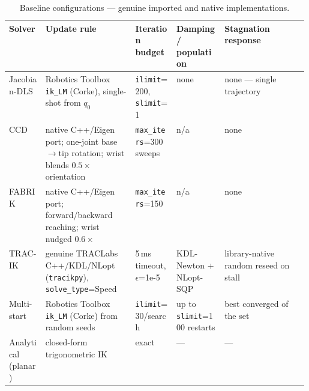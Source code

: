 \begin{table}[t]
\centering
\caption{Baseline configurations --- genuine imported and native implementations.}
\label{tab:baselines}
\small
\begin{tabular}{@{}lp{0.30\linewidth}llp{0.28\linewidth}@{}}
\toprule
Solver & Update rule & Iteration budget & Damping / population & Stagnation response \\
\midrule
Jacobian-DLS & Robotics Toolbox \texttt{ik\_LM} (Corke), single-shot from $q_0$ & \texttt{ilimit}=200, \texttt{slimit}=1 & none & none --- single trajectory \\
CCD & native C++/Eigen port; one-joint base$\to$tip rotation; wrist blends $0.5\times$ orientation & \texttt{max\_iters}=300 sweeps & n/a & none \\
FABRIK & native C++/Eigen port; forward/backward reaching; wrist nudged $0.6\times$ & \texttt{max\_iters}=150 & n/a & none \\
TRAC-IK & genuine TRACLabs C++/KDL/NLopt (\texttt{tracikpy}), \texttt{solve\_type}=Speed & 5\,ms timeout, $\epsilon$=1e-5 & KDL-Newton + NLopt-SQP & library-native random reseed on stall \\
Multi-start & Robotics Toolbox \texttt{ik\_LM} (Corke) from random seeds & \texttt{ilimit}=30/search & up to \texttt{slimit}=100 restarts & best converged of the set \\
Analytical (planar) & closed-form trigonometric IK & exact & --- & --- \\
\bottomrule
\end{tabular}
\end{table}
